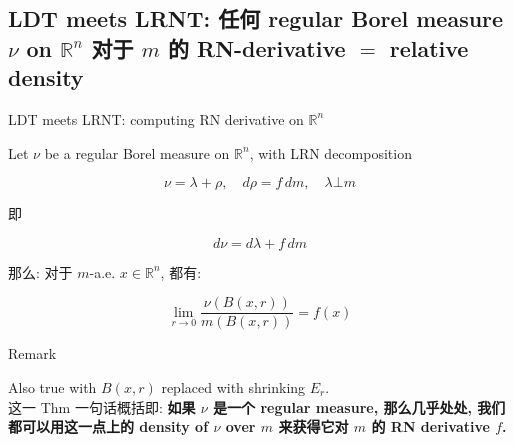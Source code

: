 \documentclass{qlnotes-export}
\begin{document}
\subsection{\texorpdfstring{LDT meets LRNT: 任何 regular Borel measure \(\nu\) on \({\mathbb{R}}^{n}\) 对于 \(m\) 的 RN-derivative \(=\) relative density}{LDT meets LRNT: 任何 regular Borel measure \textbackslash nu on \{\textbackslash mathbb\{R\}\}\^{}\{n\} 对于 m 的 RN-derivative = relative density}}\label{ldt-meets-lrnt-ux4efbux4f55-regular-borel-measure-nu-on-mathbbrn-ux5bf9ux4e8e-m-ux7684-rn-derivative-relative-density}

\begin{theorem}{LDT meets LRNT: computing RN derivative on \({\mathbb{R}}^{n}\)}\label{thm-12-differentiation-on-real-spaces-ldt-meets-lrnt-computing-rn-derivative-on-mathbb-r-n}

Let \(\nu\) be a regular Borel measure on \({\mathbb{R}}^{n}\), with LRN decomposition

\[\nu = \lambda + \rho,\quad d\rho = f\, dm,\quad\lambda\bot m\]

即

\[d\nu = d\lambda + f\, dm\]

那么: 对于 \(m\)-a.e. \(x \in {\mathbb{R}}^{n}\), 都有:

\[\lim\limits_{r\rightarrow 0}\frac{\nu(B(x,r))}{m(B(x,r))} = f(x)\]

\end{theorem}

\begin{qlremark}{Remark}

Also true with \(B(x,r)\) replaced with shrinking \(E_{r}\).\\
这一 Thm 一句话概括即: \textbf{如果 \(\nu\) 是一个 regular measure, 那么几乎处处, 我们都可以用这一点上的 density of \(\nu\) over \(m\) 来获得它对 \(m\) 的 RN derivative \(f\).}

\end{qlremark}
\end{document}
